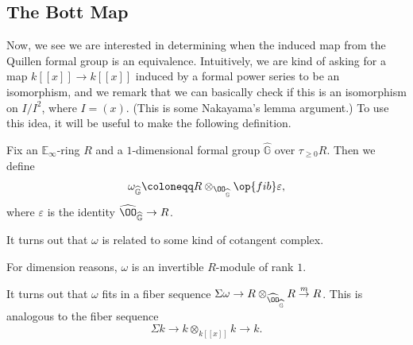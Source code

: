 \documentclass[../notes.tex]{subfiles}
\begin{document}
\subsection{The Bott Map}
Now, we see we are interested in determining when the induced map from the Quillen formal group is an equivalence. Intuitively, we are kind of asking for a map $k[[x]]\to k[[x]]$ induced by a formal power series to be an isomorphism, and we remark that we can basically check if this is an isomorphism on $I/I^2$, where $I=(x)$. (This is some Nakayama's lemma argument.) To use this idea, it will be useful to make the following definition.
\begin{definition}
	Fix an $\mathbb E_\infty$-ring $R$ and a $1$-dimensional formal group $\widehat{\mathbb G}$ over $\tau_{\ge0}R$. Then we define
	\[\omega_{\widehat{\mathbb G}}\coloneqq R\otimes_{\OO_{\widehat{\mathbb G}}}\op{fib}\varepsilon,\]
	where $\varepsilon$ is the identity $\widehat{\OO}_{\widehat{\mathbb G}}\to R$.
\end{definition}
\begin{remark}
	It turns out that $\omega$ is related to some kind of cotangent complex.
\end{remark}
\begin{remark}
	For dimension reasons, $\omega$ is an invertible $R$-module of rank $1$.
\end{remark}
\begin{remark}
	It turns out that $\omega$ fits in a fiber sequence $\Sigma\omega\to R\otimes_{\widehat{\OO}_{\widehat{\mathbb G}}}R\stackrel m\to R$. This is analogous to the fiber sequence
	\[\Sigma k\to k\otimes_{k[[x]]}k\to k.\]
\end{remark}
\end{document}
